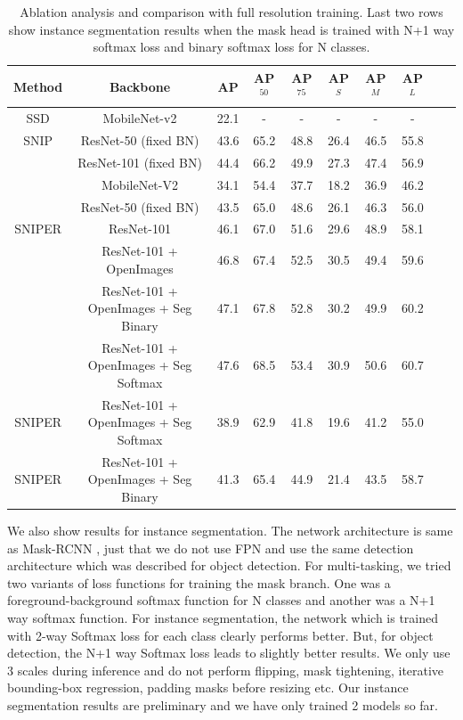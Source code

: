 \documentclass{article}
\begin{document}
\begin{table}[t]
\begin{center}
\small

\begin{tabular}{|c|c|c|c|c|c|c|c|c|c|}
  \hline
  Method & Backbone & AP & AP$^{50}$ & AP$^{75}$ & AP$^{S}$ & AP$^{M}$ & AP$^{L}$ \\
  \hline
  SSD   & MobileNet-v2 & 22.1 & - & - & - & - & - \\
  \hline
  SNIP   & ResNet-50 (fixed BN) & 43.6 & 65.2 & 48.8 & 26.4 & 46.5 & 55.8 \\
     & ResNet-101 (fixed BN) & 44.4 & 66.2 & 49.9 & 27.3 & 47.4 & 56.9 \\
  \hline
  \hline
  & MobileNet-V2 & 34.1 & 54.4 & 37.7 & 18.2 & 36.9 & 46.2 \\
  & ResNet-50 (fixed BN) & 43.5 & 65.0 & 48.6 & 26.1 & 46.3 & 56.0 \\
SNIPER   & ResNet-101 & 46.1 & 67.0 & 51.6 & 29.6 & 48.9 & 58.1 \\
   & ResNet-101 + OpenImages & 46.8 & 67.4 & 52.5 & 30.5 & 49.4 & 59.6 \\
   & ResNet-101 + OpenImages + Seg Binary & 47.1 & 67.8 & 52.8 & 30.2 & 49.9 & 60.2 \\   
   & ResNet-101 + OpenImages + Seg Softmax & 47.6 & 68.5 & 53.4 & 30.9 & 50.6 & 60.7 \\   
  \hline
  \hline
 SNIPER   & ResNet-101 + OpenImages + Seg Softmax & 38.9 & 62.9 & 41.8 & 19.6 & 41.2 & 55.0 \\ 
 SNIPER   & ResNet-101 + OpenImages + Seg Binary & 41.3 & 65.4 & 44.9 & 21.4 & 43.5 & 58.7 \\   
 \hline
 \end{tabular}
 \newline
 \caption{Ablation analysis and comparison with full resolution training. Last two rows show instance segmentation results when the mask head is trained with N+1 way softmax loss and binary softmax loss for N classes.}
\label{tab:final_bbox}
\end{center}
\end{table}
We also show results for instance segmentation. The network architecture is same as Mask-RCNN \cite{he2017mask}, just that we do not use FPN \cite{lin2017feature} and use the same detection architecture which was described for object detection. For multi-tasking, we tried two variants of loss functions for training the mask branch. One was a foreground-background softmax function for N classes and another was a N+1 way softmax function. For instance segmentation, the network which is trained with 2-way Softmax loss for each class clearly performs better. But, for object detection, the N+1 way Softmax loss leads to slightly better results. We only use 3 scales during inference and do not perform flipping, mask tightening, iterative bounding-box regression, padding masks before resizing etc. Our instance segmentation results are preliminary and we have only trained 2 models so far.
\end{document}
